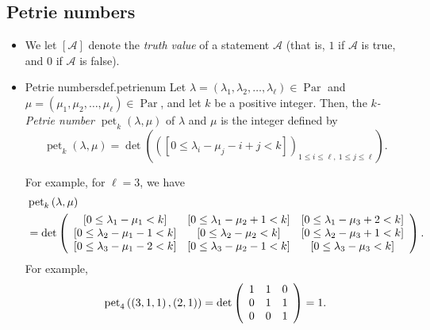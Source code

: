 \documentclass[numbers=enddot,12pt,final,onecolumn,notitlepage]{scrartcl}%
\newcommand{\defn}[1]{{\color{darkred}\emph{#1}}}
\newcommand{\0}{\phantom{c}}
\newcommand{\nowbox}{\hphantom{x} \vspace{-1.5pc}}
\begin{document}
\subsection{Petrie numbers}

\begin{itemize}
\item We let $\left[  \mathcal{A}\right]  $ denote the \defn{truth value} of a
statement $\mathcal{A}$ (that is, $1$ if $\mathcal{A}$ is true, and $0$ if
$\mathcal{A}$ is false).

\item \nowbox
\begin{definition}{Petrie numbers}{def.petrienum}
Let $\lambda=\left(  \lambda_{1},\lambda_{2},\ldots,\lambda_{\ell
}\right)  \in\operatorname*{Par}$ and $\mu=\left(  \mu_{1},\mu_{2},\ldots
,\mu_{\ell}\right)  \in\operatorname*{Par}$, and let $k$ be a positive
integer. Then, the
\defn{$k$-Petrie number $\operatorname*{pet}\nolimits_{k}\left(  \lambda,\mu\right)  $}
of $\lambda$ and $\mu$ is the integer defined by%
\[
\operatorname*{pet}\nolimits_{k}\left(  \lambda,\mu\right)  =\det\left(
\left(  \left[  0\leq\lambda_{i}-\mu_{j}-i+j<k\right]  \right)  _{1\leq
i\leq\ell,\ 1\leq j\leq\ell}\right)  .
\]
\end{definition}

For example, for $\ell=3$, we have%
\begin{align*}
&  \operatorname*{pet}\nolimits_{k}\left(  \lambda,\mu\right) \\
&  =\det
\left( \begin{array} [c]{ccc}\left[ 0\leq\lambda_{1}-\mu_{1}<k\right] & \left[ 0\leq\lambda_{1}-\mu _{2}+1<k\right] & \left[ 0\leq\lambda_{1}-\mu_{3}+2<k\right] \\ \left[ 0\leq\lambda_{2}-\mu_{1}-1<k\right] & \left[ 0\leq\lambda_{2}-\mu_{2}<k\right] & \left[ 0\leq\lambda_{2}-\mu_{3}+1<k\right] \\ \left[ 0\leq\lambda_{3}-\mu_{1}-2<k\right] & \left[ 0\leq\lambda_{3}-\mu_{2}-1<k\right] & \left[ 0\leq\lambda_{3}-\mu_{3}<k\right] \end{array} \right)
.
\end{align*}
For example,%
\[
\operatorname*{pet}\nolimits_{4}\left(  \left(  3,1,1\right)  ,\left(
2,1\right)  \right)  =\det\left(
\begin{array}
[c]{ccc}%
1 & 1 & 0\\
0 & 1 & 1\\
0 & 0 & 1
\end{array}
\right)  =1.
\]


\end{itemize}
\end{document}
